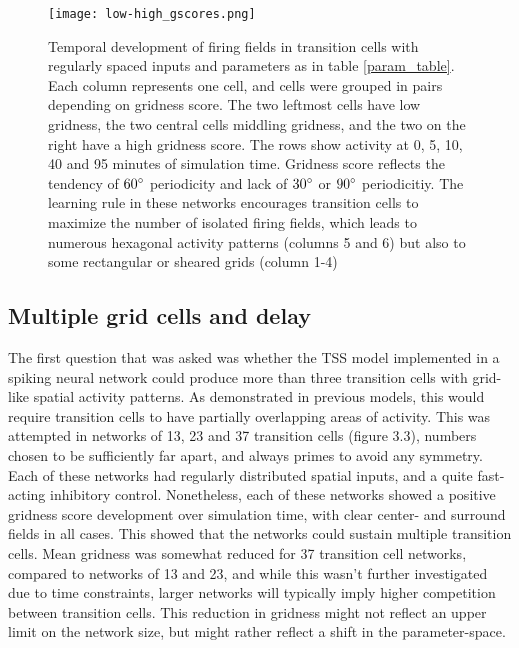\documentclass{article}
\begin{document}
    \begin{figure}[H]
        \centering
        \begin{minipage}[b]{\linewidth}
        \texttt{[image: low-high\_gscores.png]}
        \caption{Temporal development of firing fields in transition cells with regularly spaced inputs and parameters as in table \ref{param_table}. Each column represents one cell, and cells were grouped in pairs depending on gridness score. The two leftmost cells have low gridness, the two central cells middling gridness, and the two on the right have a high gridness score. The rows show activity at 0, 5, 10, 40 and 95 minutes of simulation time. Gridness score reflects the tendency of \(60\degree\) periodicity and lack of \(30\degree\) or \(90\degree\) periodicitiy. The learning rule in these networks encourages transition cells to maximize the number of isolated firing fields, which leads to numerous hexagonal activity patterns (columns 5 and 6) but also to some rectangular or sheared grids (column 1-4)} 
        \label{low-high_gscores}
        \end{minipage}
    \end{figure}


    \subsection{Multiple grid cells and delay}
    The first question that was asked was whether the TSS model implemented in a spiking neural network could produce more than three transition cells with grid-like spatial activity patterns. As demonstrated in previous models, this would require transition cells to have partially overlapping areas of activity. This was attempted in networks of 13, 23 and 37 transition cells (figure 3.3), numbers chosen to be sufficiently far apart, and always primes to avoid any symmetry. Each of these networks had regularly distributed spatial inputs, and a quite fast-acting inhibitory control. Nonetheless, each of these networks showed a positive gridness score development over simulation time, with clear center- and surround fields in all cases. This showed that the networks could sustain multiple transition cells. Mean gridness was somewhat reduced for 37 transition cell networks, compared to networks of 13 and 23, and while this wasn't further investigated due to time constraints, larger networks will typically imply higher competition between transition cells. This reduction in gridness might not reflect an upper limit on the network size, but might rather reflect a shift in the parameter-space. 
\end{document}
